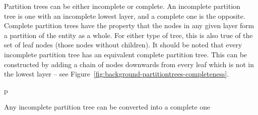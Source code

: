 
Partition trees can be either incomplete or complete. An incomplete partition tree is one with an incomplete lowest layer, and a complete one is the opposite. Complete partition trees have the property that the nodes in any given layer form a partition of the entity as a whole. For either type of tree, this is also true of the set of leaf nodes (those nodes without children). It should be noted that every incomplete partition tree has an equivalent complete partition tree. This can be constructed by adding a chain of nodes downwards from every leaf which is not in the lowest layer -- see Figure~\ref{fig:background-partitiontrees-completeness}.

\begin{stusubfig}{p}
	\hspace{4mm}%
\caption{Any incomplete partition tree can be converted into a complete one}
\label{fig:background-partitiontrees-completeness}
\end{stusubfig}

